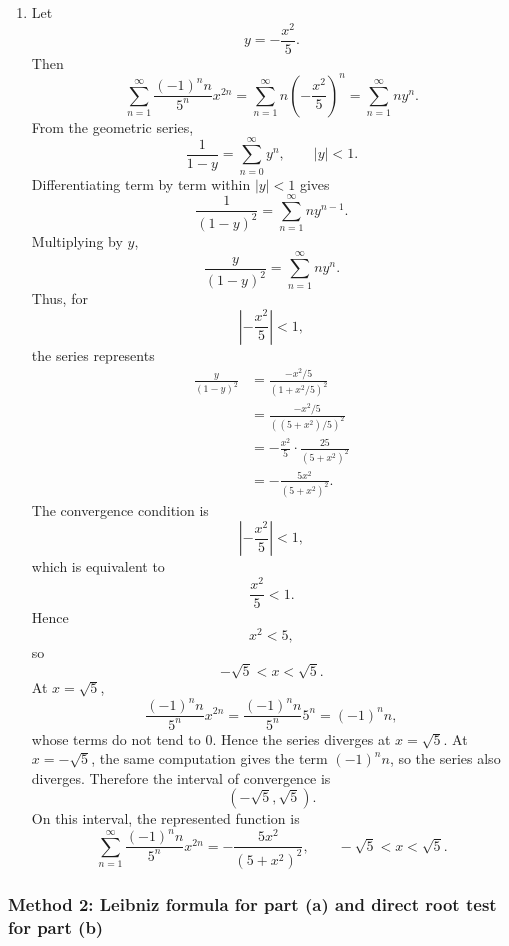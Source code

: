 \documentclass[12pt]{article}
\begin{document}
\begin{enumerate}[label=(\alph*)]
\item Let
\[
y=-\frac{x^2}{5}.
\]
Then
\[
\sum_{n=1}^{\infty}\frac{(-1)^n n}{5^n}x^{2n}
=
\sum_{n=1}^{\infty}n\left(-\frac{x^2}{5}\right)^n
=
\sum_{n=1}^{\infty}ny^n.
\]
From the geometric series,
\[
\frac1{1-y}=\sum_{n=0}^{\infty}y^n,
\qquad |y|<1.
\]
Differentiating term by term within $|y|<1$ gives
\[
\frac1{(1-y)^2}
=
\sum_{n=1}^{\infty}ny^{n-1}.
\]
Multiplying by $y$,
\[
\frac{y}{(1-y)^2}
=
\sum_{n=1}^{\infty}ny^n.
\]
Thus, for
\[
\left|-\frac{x^2}{5}\right|<1,
\]
the series represents
\begin{align*}
\frac{y}{(1-y)^2}
&=
\frac{-x^2/5}{\left(1+x^2/5\right)^2}\\
&=
\frac{-x^2/5}{\left((5+x^2)/5\right)^2}\\
&=
-\frac{x^2}{5}\cdot \frac{25}{(5+x^2)^2}\\
&=
-\frac{5x^2}{(5+x^2)^2}.
\end{align*}
The convergence condition is
\[
\left|-\frac{x^2}{5}\right|<1,
\]
which is equivalent to
\[
\frac{x^2}{5}<1.
\]
Hence
\[
x^2<5,
\]
so
\[
-\sqrt5<x<\sqrt5.
\]
At $x=\sqrt5$,
\[
\frac{(-1)^n n}{5^n}x^{2n}
=
\frac{(-1)^n n}{5^n}5^n
=
(-1)^n n,
\]
whose terms do not tend to $0$. Hence the series diverges at $x=\sqrt5$. At $x=-\sqrt5$, the same computation gives the term $(-1)^n n$, so the series also diverges. Therefore the interval of convergence is
\[
(-\sqrt5,\sqrt5).
\]
On this interval, the represented function is
\[
\boxed{
\sum_{n=1}^{\infty}\frac{(-1)^n n}{5^n}x^{2n}
=
-\frac{5x^2}{(5+x^2)^2},
\qquad
-\sqrt5<x<\sqrt5.}
\]
\end{enumerate}

\newpage
\subsubsection{Method 2: Leibniz formula for part (a) and direct root test for part (b)}
\end{document}
